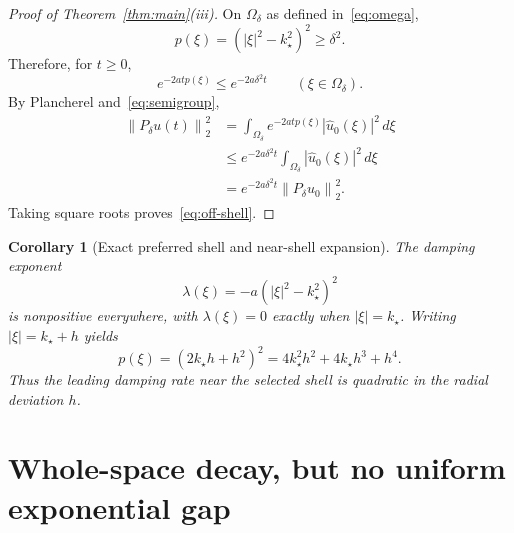 \documentclass[11pt]{article}
\newtheorem{corollary}[theorem]{Corollary}
\theoremstyle{remark}
\newcommand{\norm}[1]{\left\lVert #1\right\rVert}
\newcommand{\abs}[1]{\left\lvert #1\right\rvert}
\begin{document}
\begin{proof}[Proof of Theorem~\ref{thm:main}(iii)]
On $\Omega_\delta$ as defined in~\eqref{eq:omega},
\begin{equation}
p(\xi)=(\abs{\xi}^2-k_\star^2)^2\ge\delta^2.
\end{equation}
Therefore, for $t\ge0$,
\begin{equation}
e^{-2atp(\xi)}\le e^{-2a\delta^2t}
\qquad(\xi\in\Omega_\delta).
\end{equation}
By Plancherel and~\eqref{eq:semigroup},
\begin{align}
\norm{P_\delta u(t)}_2^2
&=\int_{\Omega_\delta}
 e^{-2atp(\xi)}\abs{\widehat u_0(\xi)}^2\,d\xi\\
&\le e^{-2a\delta^2t}
 \int_{\Omega_\delta}\abs{\widehat u_0(\xi)}^2\,d\xi\\
&=e^{-2a\delta^2t}\norm{P_\delta u_0}_2^2.
\end{align}
Taking square roots proves~\eqref{eq:off-shell}.
\end{proof}

\begin{corollary}[Exact preferred shell and near-shell expansion]
The damping exponent
\begin{equation}\label{eq:lambda}
\lambda(\xi)=-a(\abs{\xi}^2-k_\star^2)^2
\end{equation}
is nonpositive everywhere, with $\lambda(\xi)=0$ exactly when
$\abs{\xi}=k_\star$.  Writing $\abs{\xi}=k_\star+h$ yields
\begin{equation}
p(\xi)=(2k_\star h+h^2)^2
=4k_\star^2h^2+4k_\star h^3+h^4.
\end{equation}
Thus the leading damping rate near the selected shell is quadratic in
the radial deviation $h$.
\end{corollary}

\section{Whole-space decay, but no uniform exponential gap}
\end{document}

